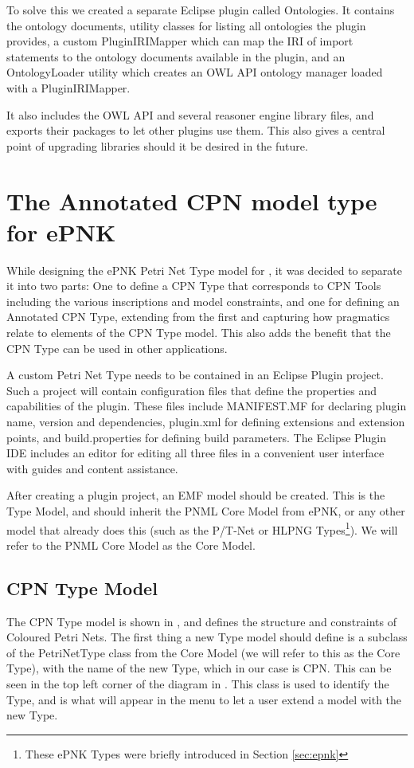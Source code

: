 To solve this we created a separate Eclipse plugin called Ontologies.
It contains the ontology documents, utility classes for listing all ontologies the
plugin provides, a custom PluginIRIMapper which can map the IRI of import
statements to the ontology documents available in the plugin, and an
OntologyLoader utility which creates an OWL API ontology manager loaded
with a PluginIRIMapper.

It also includes the OWL API and several reasoner engine library files, and
exports their packages to let other plugins use them. This also gives a central
point of upgrading libraries should it be desired in the future.

\section{The Annotated CPN model type for ePNK}
While designing the ePNK Petri Net Type model for \thename{}, it was decided to
separate it into two parts: One to define a CPN Type that corresponds to CPN
Tools including the various inscriptions and model constraints, and one
for defining an Annotated CPN Type, extending from the first and capturing how
pragmatics relate to elements of the CPN Type model.
This also adds the benefit that the CPN Type can be used in other
applications.

A custom Petri Net Type needs to be contained in an Eclipse Plugin project.
Such a project will contain configuration files that define the properties and
capabilities of the plugin. These files include MANIFEST.MF for declaring plugin
name, version and dependencies, plugin.xml for defining extensions and extension
points, and build.properties for defining build parameters. The Eclipse Plugin
IDE includes an editor for editing all three files in a convenient user
interface with guides and content assistance.

After creating a plugin project, an EMF model should be created. This is the
Type Model, and should inherit the PNML Core Model from ePNK, or any other model
that already does this (such as the P/T-Net or HLPNG Types\footnote{These
ePNK Types were briefly introduced in Section \ref{sec:epnk}}).
We will refer to the PNML Core Model as the Core Model.

\subsection{CPN Type Model}
The CPN Type model is shown in , and defines the
structure and constraints of Coloured Petri Nets. The first thing a new Type
model should define is a subclass of the PetriNetType class from the Core Model
(we will refer to this as the Core Type), with the name of the new Type, which in
our case is CPN. This can be seen in the top left corner of the diagram in
. This class is used to identify the Type, and is
what will appear in the menu to let a user extend a model with the new Type.

